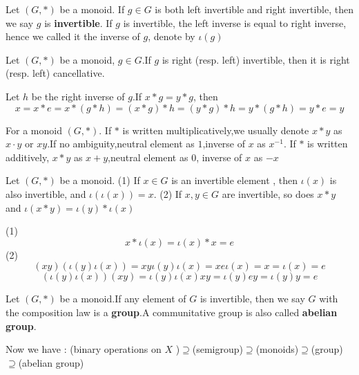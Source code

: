 \documentclass{book}
\numberwithin{equation}{section}
\begin{document}
\begin{definitionenv}
    Let $(G,*)$ be a monoid. If $g\in G$ is both left invertible and right invertible, then we say $g$ is \textbf{invertible}.
    If $g$ is invertible, the left inverse is equal to right inverse, hence we called it the inverse of $g$, denote by $\iota(g)$
\end{definitionenv}
\begin{propositionenv}
    Let $(G,*)$ be a monoid, $g\in G$.If $g$ is right (resp. left) invertible, then it is right (resp. left) cancellative.
\end{propositionenv}
\begin{proofenv}
    Let $h$ be the right inverse of $g$.If $x*g=y*g$, then 
    $$x=x*e=x*(g*h)=(x*g)*h=(y*g)*h=y*(g*h)=y*e=y$$
\end{proofenv}
\begin{notationenv}
    For a monoid $(G,*)$.
    \newline
    If $*$ is written multiplicatively,we usually denote $x*y$ as $x\cdot y$ or $xy$.If no ambiguity,neutral element as $1$,inverse of $x$ as $x^{-1}$.
    \newline
    If $*$ is written additively, $x*y$ as $x+y$,neutral element as $0$, inverse of $x$ as $-x$
\end{notationenv}
\begin{propositionenv}
    Let $(G,*)$ be a monoid.
    \newline
    (1) If $x\in G$ is an invertible element , then $\iota (x)$ is also invertible, and $\iota(\iota(x))=x$.
    \newline
    (2) If $x,y\in G$ are invertible, so does $x*y$ and $\iota(x*y)=\iota(y)*\iota(x)$
\end{propositionenv}
\begin{proofenv}
    \quad\newline
    (1) $$x*\iota(x)=\iota(x)*x=e$$
    (2) $$(xy)(\iota(y)\iota(x))=xy\iota(y)\iota(x)=xe\iota(x)=x=\iota(x)=e$$
    $$(\iota(y)\iota(x))(xy)=\iota(y)\iota(x)xy=\iota(y)ey=\iota(y)y=e$$
\end{proofenv}
\begin{definitionenv}
    Let $(G,*)$ be a monoid.If any element of $G$ is invertible, then we say $G$ with the composition law is a \textbf{group}.A communitative group is also called \textbf{abelian group}.
\end{definitionenv}
\begin{box2}
   Now we have : 
   \newline
   {\color{mlv} (binary operations on $X$ )$\supseteq$(semigroup)$\supseteq$(monoids)$\supseteq$(group)$\supseteq$(abelian group)}

\end{box2}
\end{document}
